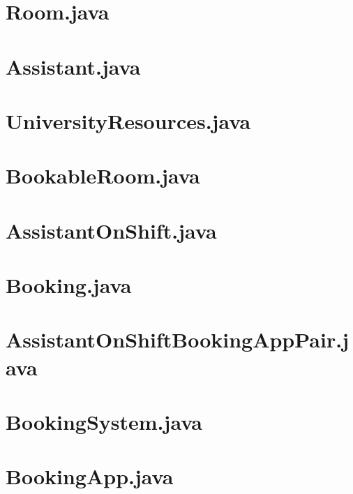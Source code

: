 \documentclass{article}
\begin{document}
\section{Room.java}


\section{Assistant.java}


\section{UniversityResources.java}


\section{BookableRoom.java}


\section{AssistantOnShift.java}


\section{Booking.java}


\section{AssistantOnShiftBookingAppPair.java}


\section{BookingSystem.java}


\section{BookingApp.java}

\end{document}
